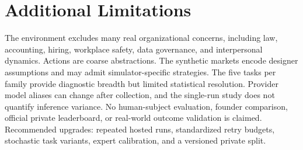 \documentclass[sigconf]{acmart}
\begin{document}
\section{Additional Limitations}
The environment excludes many real organizational concerns, including law, accounting, hiring, workplace safety, data governance, and interpersonal dynamics.
Actions are coarse abstractions.
The synthetic markets encode designer assumptions and may admit simulator-specific strategies.
The five tasks per family provide diagnostic breadth but limited statistical resolution.
Provider model aliases can change after collection, and the single-run study does not quantify inference variance.
No human-subject evaluation, founder comparison, official private leaderboard, or real-world outcome validation is claimed.
Recommended upgrades: repeated hosted runs, standardized retry budgets, stochastic task variants, expert calibration, and a versioned private split.
\end{document}
